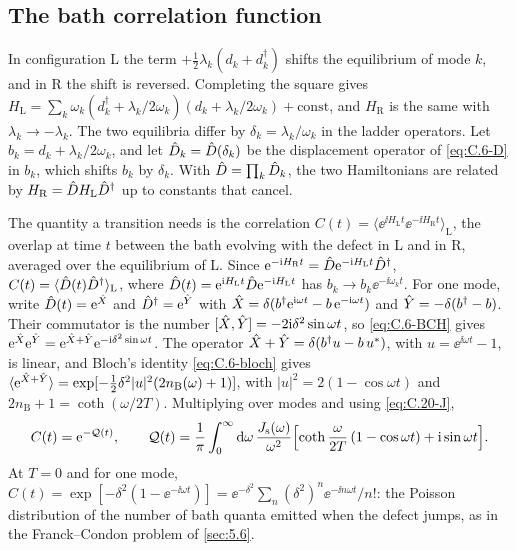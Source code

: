 \subsection{The bath correlation function}

In configuration L the term $+\tfrac12\lambda_k(d_k + d_k^\dagger)$ shifts the equilibrium of mode $k$, and in R the shift is reversed. Completing the square gives $H_{\mathrm{L}} = \sum_k\omega_k(d_k^\dagger + \lambda_k/2\omega_k)(d_k + \lambda_k/2\omega_k) + \text{const}$, and $H_{\mathrm{R}}$ is the same with $\lambda_k \to -\lambda_k$. The two equilibria differ by $\delta_k = \lambda_k/\omega_k$ in the ladder operators. Let $b_k = d_k + \lambda_k/2\omega_k$, and let $\hat{D}_k = \hat{D}(\delta_k)$ be the displacement operator of \cref{eq:C.6-D} in $b_k$, which shifts $b_k$ by $\delta_k$. With $\hat{D} = \prod_k\hat{D}_k$, the two Hamiltonians are related by $H_{\mathrm{R}} = \hat{D}H_{\mathrm{L}}\hat{D}^\dagger$ up to constants that cancel.

The quantity a transition needs is the correlation $C(t) = \langle\ee^{\ii H_{\mathrm{L}}t}\ee^{-\ii H_{\mathrm{R}}t}\rangle_{\mathrm{L}}$, the overlap at time $t$ between the bath evolving with the defect in L and in R, averaged over the equilibrium of L. Since $\mathrm{e}^{-\mathrm{i} H_{\mathrm{R}}t} = \hat{D}\mathrm{e}^{-\mathrm{i} H_{\mathrm{L}}t}\hat{D}^\dagger$, $C(t) = \langle\hat{D}(t)\hat{D}^\dagger\rangle_{\mathrm{L}}$, where $\hat{D}(t) = \mathrm{e}^{\mathrm{i} H_{\mathrm{L}}t}\hat{D}\mathrm{e}^{-\mathrm{i} H_{\mathrm{L}}t}$ has $b_k \to b_k\ee^{-\ii\omega_kt}$. For one mode, write $\hat{D}(t) = \mathrm{e}^{\hat{X}}$ and $\hat{D}^\dagger = \mathrm{e}^{\hat{Y}}$ with $\hat{X} = \delta(b^\dagger\mathrm{e}^{\mathrm{i}\omega t} - b\,\mathrm{e}^{-\mathrm{i}\omega t})$ and $\hat{Y} = -\delta(b^\dagger - b)$. Their commutator is the number $[\hat{X},\hat{Y}] = -2\mathrm{i}\delta^2\sin\omega t$, so \cref{eq:C.6-BCH} gives $\mathrm{e}^{\hat{X}}\mathrm{e}^{\hat{Y}} = \mathrm{e}^{\hat{X} + \hat{Y}}\mathrm{e}^{-\mathrm{i}\delta^2\sin\omega t}$. The operator $\hat{X} + \hat{Y} = \delta(b^\dagger u - b\,u^*)$, with $u = \ee^{\ii\omega t} - 1$, is linear, and Bloch's identity \cref{eq:C.6-bloch} gives $\langle\mathrm{e}^{\hat{X} + \hat{Y}}\rangle = \exp[-\tfrac12\delta^2|u|^2(2n_{\mathrm{B}}(\omega) + 1)]$, with $|u|^2 = 2(1 - \cos\omega t)$ and $2n_{\mathrm{B}} + 1 = \coth(\omega/2T)$. Multiplying over modes and using \cref{eq:C.20-J},
\begin{equation}
  C(t) = \mathrm{e}^{-\mathcal{Q}(t)}, \qquad
  \mathcal{Q}(t) = \frac1\pi\int_0^\infty\mathrm{d}\omega\,\frac{J_{\mathrm{s}}(\omega)}{\omega^2}\Bigl[\coth\frac{\omega}{2T}\,(1 - \cos\omega t) + \mathrm{i}\sin\omega t\Bigr] .
  \label{eq:C.20-Q}
\end{equation}
At $T = 0$ and for one mode, $C(t) = \exp[-\delta^2(1 - \ee^{-\ii\omega t})] = \ee^{-\delta^2}\sum_n(\delta^2)^n\ee^{-\ii n\omega t}/n!$: the Poisson distribution of the number of bath quanta emitted when the defect jumps, as in the Franck--Condon problem of \cref{sec:5.6}.

